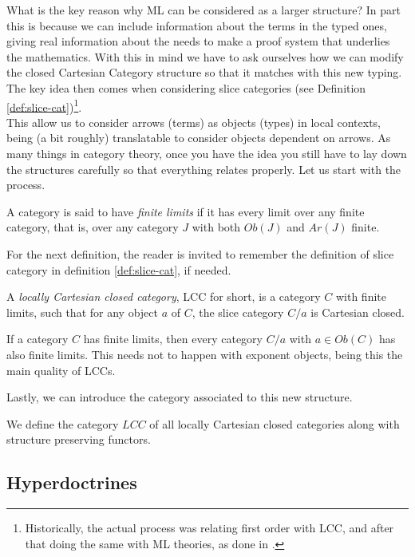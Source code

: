 What is the key reason why ML can be considered as a larger structure? In part this is because we can include information about the terms in the typed ones, giving real information about the needs to make a proof system that underlies the mathematics. With this in mind we have to ask ourselves how we can modify the closed Cartesian Category structure so that it matches with this new typing.  The key idea then comes when considering slice categories (see Definition \ref{def:slice-cat})\footnote{Historically, the actual process was relating first order with LCC, and after that doing the same with ML theories, as done in \cite{seely1977hyperdoctrines}.}.\\

This allow us to consider arrows (terms) as objects (types) in local contexts, being (a bit roughly) translatable to consider objects dependent on arrows.  As many things in category theory, once you have the idea you still have to lay down the structures carefully so that everything relates properly. Let us start with the process.

\begin{definition}
  A category is said to have \emph{finite limits} if it has every limit over any finite category, that is, over any category $J$ with both $Ob(J)$ and $Ar(J)$ finite.
\end{definition}

For the next definition, the reader is invited to remember the definition of slice category in definition \ref{def:slice-cat}, if needed.
\begin{definition}
  A \emph{locally Cartesian closed category}, LCC for short,  is a category $C$ with finite limits, such that for any object $a$ of $C$, the slice category $C/a $ is Cartesian closed.
\end{definition}

\begin{remark}
  If a category $C$ has finite limits, then every category $C/a$ with $a\in Ob(C)$  has also finite limits. This needs not to happen with exponent objects, being this the main quality of LCCs.
\end{remark}
Lastly, we can introduce the category associated to this new structure.
\begin{definition}
  We define the category $LCC$ of all locally Cartesian closed categories along with structure preserving functors.
\end{definition}
\subsection{Hyperdoctrines}


